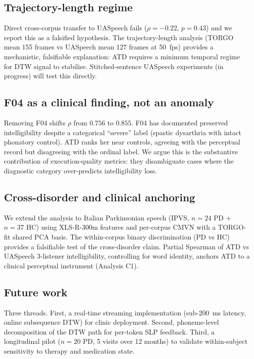 \subsection{Trajectory-length regime}
Direct cross-corpus transfer to UASpeech fails ($\rho{=}{-}0.22$,
$p{=}0.43$) and we report this as a falsified hypothesis. The
trajectory-length analysis (TORGO mean 155 frames vs UASpeech mean
127 frames at 50~fps) provides a mechanistic, falsifiable
explanation: ATD requires a minimum temporal regime for DTW signal
to stabilise. Stitched-sentence UASpeech experiments (in progress)
will test this directly.

\subsection{F04 as a clinical finding, not an anomaly}
Removing F04 shifts $\rho$ from $0.756$ to $0.855$. F04 has
documented preserved intelligibility despite a categorical
``severe'' label (spastic dysarthria with intact phonatory
control). ATD ranks her near controls, agreeing with the perceptual
record but disagreeing with the ordinal label. We argue this is the
substantive contribution of execution-quality metrics: they
disambiguate cases where the diagnostic category over-predicts
intelligibility loss.

\subsection{Cross-disorder and clinical anchoring}
We extend the analysis to Italian Parkinsonian speech (IPVS,
$n{=}24$ PD + $n{=}37$ HC) using XLS-R-300m features and per-corpus
CMVN with a TORGO-fit shared PCA basis. The within-corpus binary
discrimination (PD vs HC) provides a falsifiable test of the
cross-disorder claim. Partial Spearman of ATD vs UASpeech 3-listener
intelligibility, controlling for word identity, anchors ATD to a
clinical perceptual instrument (Analysis C1).

\subsection{Future work}
Three threads. First, a real-time streaming implementation
(sub-200~ms latency, online subsequence DTW) for clinic deployment.
Second, phoneme-level decomposition of the DTW path for per-token
SLP feedback. Third, a longitudinal pilot ($n{=}20$ PD, 5 visits
over 12 months) to validate within-subject sensitivity to therapy
and medication state.
